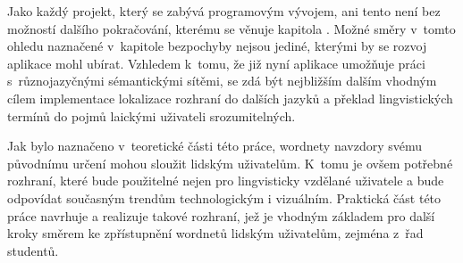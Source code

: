 \documentclass[a4paper, 11pt, oneside, showtrims]{book}
\newcommand{\itNameRef}[1]{\textit{\nameref{#1}}}
\begin{document}
			Jako každý projekt, který se zabývá programovým vývojem, ani tento není bez možností dalšího pokračování, kterému se věnuje kapitola \itNameRef{cha:co-se-nestihlo}. Možné směry v~tomto ohledu naznačené v~kapitole bezpochyby nejsou jediné, kterými by se rozvoj aplikace mohl ubírat. Vzhledem k~tomu, že již nyní aplikace umožňuje práci s~různojazyčnými sémantickými sítěmi, se zdá být nejbližším dalším vhodným cílem implementace lokalizace rozhraní do dalších jazyků a překlad lingvistických termínů do pojmů laickými uživateli srozumitelných.

			Jak bylo naznačeno v~teoretické části této práce, wordnety navzdory svému původnímu určení mohou sloužit lidským uživatelům. K~tomu je ovšem potřebné rozhraní, které bude použitelné nejen pro lingvisticky vzdělané uživatele a bude odpovídat současným trendům technologickým i vizuálním. Praktická část této práce navrhuje a realizuje takové rozhraní, jež je vhodným základem pro další kroky směrem ke zpřístupnění wordnetů lidským uživatelům, zejména z~řad studentů.








			


 
	\printbibliography[]

\end{document}
